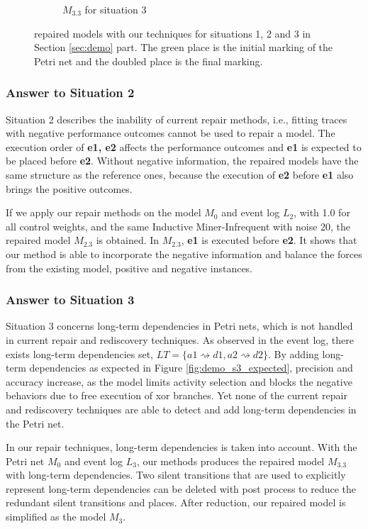 \begin{figure}[htp]
\begin{subfigure}[b]{0.32\textwidth}
	\caption{ $M_{3.3}$ for situation 3}
	\label{fig:demo_dfg_s3}
\end{subfigure}
	\caption[Repaired models with Dfg-repair based on motivating examples]{repaired models with our techniques for situations 1, 2 and 3 in Section \ref{sec:demo} part. The green place is the initial marking of the Petri net and the doubled place is the final marking.}
	\label{fig:demo_dfg}
\end{figure}
\subsubsection{Answer to Situation 2}
Situation 2 describes the inability of current repair methods, i.e., fitting traces with negative performance outcomes cannot be used to repair a model. 
The execution order of \textbf{e1, e2} affects the performance outcomes and \textbf{e1} is expected to be placed before \textbf{e2}. Without negative information, the repaired models have the same structure as the reference ones, because the execution of \textbf{e2} before \textbf{e1} also brings  the positive outcomes. 

If we apply our repair methods on the model $M_0$ and event log $L_2$, with 1.0 for all control weights, and the same Inductive Miner-Infrequent with noise 20, the repaired model $M_{2.3}$ is obtained. In $M_{2.3}$, \textbf{e1} is executed before \textbf{e2}. It shows that our method is able to incorporate the negative information and balance the forces from the existing model, positive and negative instances. 

\subsubsection{Answer to Situation 3}
Situation 3 concerns long-term dependencies in Petri nets, which is not handled in current repair and rediscovery techniques. As observed in the event log, there exists long-term dependencies set, $LT=\{ a1\rightsquigarrow d1, a2\rightsquigarrow d2\}$.  By adding long-term dependencies as expected in Figure \ref{fig:demo_s3_expected}, precision and accuracy increase, as the model limits activity selection and blocks the negative behaviors due to free execution of xor branches. Yet none of the current repair and rediscovery techniques are able to detect and add long-term dependencies in the Petri net. 

In our repair techniques, long-term dependencies is taken into account. With the Petri net $M_0$ and event log $L_3$, our methods produces the repaired model $M_{3.3}$ with long-term dependencies. Two silent transitions that are used to explicitly represent long-term dependencies can be deleted with post process to reduce the redundant silent transitions and places. After reduction, our repaired model is simplified as the model $M_{3}$. 
